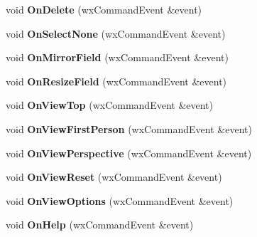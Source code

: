 \begin{DoxyCompactItemize}
\item 
\hypertarget{classgui_parent_window_a3e415e3b68eefcbb21e1ca8a4a0a0be0}{
void {\bfseries OnDelete} (wxCommandEvent \&event)}
\label{classgui_parent_window_a3e415e3b68eefcbb21e1ca8a4a0a0be0}

\item 
\hypertarget{classgui_parent_window_a2478c1273e08c0e4b939cd856cba68e9}{
void {\bfseries OnSelectNone} (wxCommandEvent \&event)}
\label{classgui_parent_window_a2478c1273e08c0e4b939cd856cba68e9}

\item 
\hypertarget{classgui_parent_window_a3f706fca5ddc0ea5a81aad80484c0937}{
void {\bfseries OnMirrorField} (wxCommandEvent \&event)}
\label{classgui_parent_window_a3f706fca5ddc0ea5a81aad80484c0937}

\item 
\hypertarget{classgui_parent_window_a3bc861289272f6e296a3841d5619ef90}{
void {\bfseries OnResizeField} (wxCommandEvent \&event)}
\label{classgui_parent_window_a3bc861289272f6e296a3841d5619ef90}

\item 
\hypertarget{classgui_parent_window_aad58e148ce5f6599fb6c747931d909c3}{
void {\bfseries OnViewTop} (wxCommandEvent \&event)}
\label{classgui_parent_window_aad58e148ce5f6599fb6c747931d909c3}

\item 
\hypertarget{classgui_parent_window_a8b173a225d47952b08826d0075237619}{
void {\bfseries OnViewFirstPerson} (wxCommandEvent \&event)}
\label{classgui_parent_window_a8b173a225d47952b08826d0075237619}

\item 
\hypertarget{classgui_parent_window_aeb491e2e0bb431a586f2c337a767b5a1}{
void {\bfseries OnViewPerspective} (wxCommandEvent \&event)}
\label{classgui_parent_window_aeb491e2e0bb431a586f2c337a767b5a1}

\item 
\hypertarget{classgui_parent_window_a98bd84a0343113b31d153167a34ac7c1}{
void {\bfseries OnViewReset} (wxCommandEvent \&event)}
\label{classgui_parent_window_a98bd84a0343113b31d153167a34ac7c1}

\item 
\hypertarget{classgui_parent_window_a9f55d77fc5c897fe16905ec22ef4c1d3}{
void {\bfseries OnViewOptions} (wxCommandEvent \&event)}
\label{classgui_parent_window_a9f55d77fc5c897fe16905ec22ef4c1d3}

\item 
\hypertarget{classgui_parent_window_ac3bf91ca505f98cb51b184f83240ed43}{
void {\bfseries OnHelp} (wxCommandEvent \&event)}
\label{classgui_parent_window_ac3bf91ca505f98cb51b184f83240ed43}


\end{DoxyCompactItemize}
